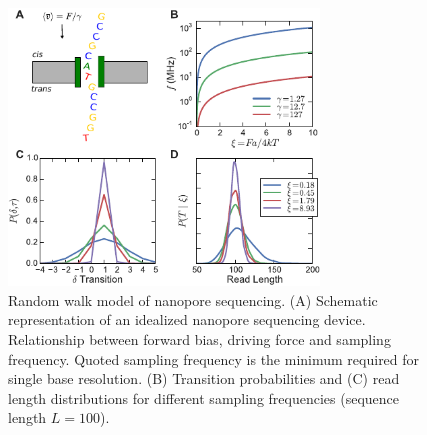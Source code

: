 \documentclass{biophys_letter}
\begin{document}
\begin{figure}
  \centering
  \includegraphics[width=3.25in]{fig/new_fig1_withcartoon.pdf}
  \caption{Random walk model of nanopore sequencing. (A) Schematic representation of an idealized nanopore sequencing device. Relationship between forward bias, driving force and sampling frequency. Quoted sampling frequency is the minimum required for single base resolution. (B) Transition probabilities and (C) read length distributions for different sampling frequencies (sequence length $L=100$).}
  \label{fig:fig1}
\end{figure}
\end{document}
